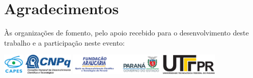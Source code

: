 \documentclass[%
  10pt,%
  aspectratio = 169,%
  compress,%
  t,%
  english,%
  brazilian,%
  tikz,
]{beamer}
\begin{document}


\section{Agradecimentos}\label{sec:agrad}


\begin{frame}{}{}
Às organizações de fomento, pelo apoio recebido para o desenvolvimento deste trabalho e a participação neste evento:
\begin{center}
\includegraphics[height = 10mm]{./Logos/apoio-capes}
\hfill%
\includegraphics[height = 10mm]{./Logos/apoio-cnpq}
\hfill%
\includegraphics[height = 10mm]{./Logos/apoio-fa-gov-pr}
\hfill%
\includegraphics[height = 10mm]{./Logos/utfpr}
\end{center}
\end{frame}


\end{document}
